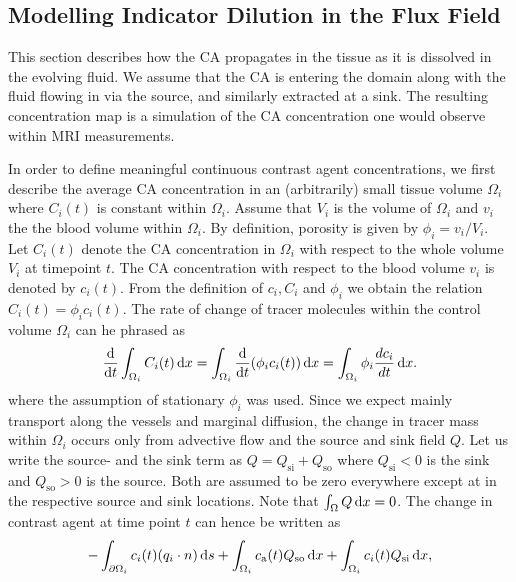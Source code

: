 \documentclass[paper=a4, fontsize=11pt,parskip=half,headings=small]{scrartcl}
\newcommand{\Qso}{Q_{\mathrm{so}}}
\newcommand{\Qsi}{Q_{\mathrm{si}}}
\newcommand{\ca}{c_\mathrm{a}}
\newcommand{\sic}{\milli\mol\per\milli\meter\cubed}
\begin{document}
	\subsection{Modelling Indicator Dilution in the Flux Field}\label{sec:transport}
	
	This section describes how the CA propagates in the tissue as it is dissolved in the evolving fluid.
	We assume that the CA is entering the domain along with the fluid flowing in via the source, and similarly extracted at a sink.
	The resulting concentration map is a simulation of the CA concentration one would observe within MRI measurements.
	
	In order to define meaningful continuous contrast agent concentrations, we first describe the average CA concentration in an (arbitrarily) small tissue volume $\Omega_i$ where $C_i(t)$ is constant within $\Omega_i$.
	Assume that $V_i$ is the volume of $\Omega_i$ and $v_i$ the the blood volume within $\Omega_i$.
	By definition, porosity is given by $\phi_i = v_i/V_i$.
	Let $C_i(t)$ denote the CA concentration in $\Omega_i$ with respect to the whole volume $V_i$ at timepoint $t$.
	The CA concentration with respect to the blood volume $v_i$ is denoted by $c_i(t)$.
	From the definition of $c_i,C_i$ and $\phi_i$ we obtain the relation $C_i(t) = \phi_i  c_i(t)$.
	The rate of change of tracer molecules within the control volume $\Omega_i$ can he phrased as
	\begin{equation}
		\frac{\mathrm{d}}{\mathrm{d} t}\int_{\Omega_i}C_i(t) \,\mathrm{d} x = \int_{\Omega_i}\frac{\mathrm{d}}{\mathrm{d} t}(\phi_i c_i(t)) \,\mathrm{d} x = \int_{\Omega_i} \phi_i \frac{d c_i}{dt}\,\mathrm{d} x.
		\label{eq:dmdt}
	\end{equation}	
	where the assumption of stationary $\phi_i$ was used.
	Since we expect mainly transport along the vessels and marginal diffusion, the change in tracer mass within $\Omega_i$ occurs only from advective flow and the source and sink field $Q$.
	Let us write the source- and the sink term as $Q = \Qsi + \Qso$ where $\Qsi < 0$ is the sink and $\Qso > 0$ is the source. 
	Both are assumed to be zero everywhere except at in the respective source and sink locations.
	Note that $\int_\Omega Q \,\mathrm{d} x = 0$. 
	The change in contrast agent at time point $t$ can hence be written as
	\begin{equation}
		-\int_{ \partial \Omega_i}c_i(t)(q_i \cdot n)\diffint s + \int_{\Omega_i}\ca(t) \Qso \diffint x + \int_{\Omega_i}c_i(t)\Qsi \diffint x,
		\label{eq:surfflux}
	\end{equation}
\end{document}
